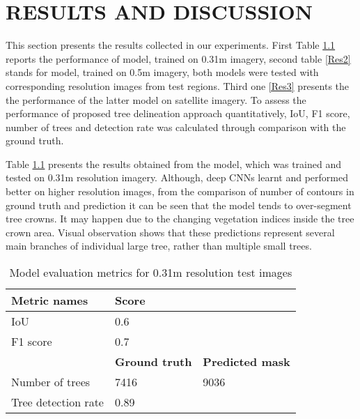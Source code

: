 \renewcommand\chaptername{}
\chapter{RESULTS AND DISCUSSION}

This section presents the results collected in our experiments. First Table \ref{Res1} reports the performance of model, trained on 0.31m imagery, second table \ref{Res2} stands for model, trained on 0.5m imagery, both models were tested with corresponding resolution images from test regions. Third one \ref{Res3} presents the the performance of the latter model on satellite imagery. To assess the performance of proposed tree delineation approach quantitatively, \gls{IoU}, F1 score, number of trees and detection rate was calculated through comparison with the ground truth.

Table \ref{Res1} presents the results obtained from the model, which was trained and tested on 0.31m resolution imagery. Although, deep CNNs learnt and performed better on higher resolution images, from the comparison of number of contours in ground truth and prediction it can be seen that the model tends to over-segment tree crowns. It may happen due to the changing vegetation indices inside the tree crown area. Visual observation shows that these predictions represent several main branches of individual large tree, rather than multiple small trees.


\begin{table}[h]
\caption{Model evaluation metrics for 0.31m resolution test images}
\label{Res1}
\vskip 0.15in
\begin{center}
\begin{small}
\begin{sc}
\begin{tabular}{lp{4cm}p{4cm}}
\hline
\textbf{Metric names} & \textbf{Score} & \\\hline
\gls{IoU} &0.6  & \\
F1 score &0.7  & \\\hline
&\textbf{Ground truth}  & \textbf{Predicted mask}\\\hline
Number of trees &7416  & 9036\\
Tree detection rate &0.89  & \\\hline
\end{tabular}
\end{sc}
\end{small}
\end{center}
\vskip -0.1in
\end{table}

